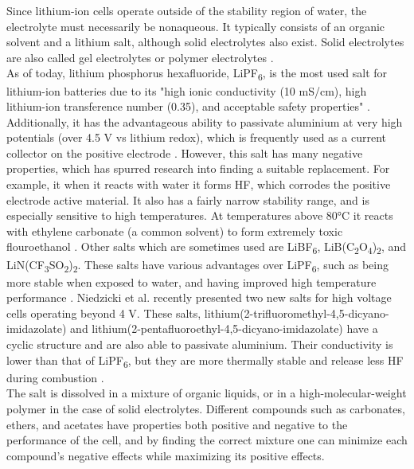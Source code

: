 \documentclass[12pt]{article} %
\begin{document}
Since lithium-ion cells operate outside of the stability region of water, the electrolyte must necessarily be nonaqueous.
It typically consists of an organic solvent and a lithium salt, although solid electrolytes also exist.
Solid electrolytes are also called gel electrolytes or polymer electrolytes \cite{reddy_thomas_section_2011-3}.
\\
As of today, lithium phosphorus hexafluoride, LiPF\textsubscript{6}, is the most used salt for lithium-ion batteries due to its "high ionic conductivity (10 mS/cm), high lithium-ion transference number (\mytilde{}0.35), and acceptable safety properties" \cite{reddy_thomas_section_2011-3}.
Additionally, it has the advantageous ability to passivate aluminium at very high potentials (over 4.5 V vs lithium redox), which is frequently used as a current collector on the positive electrode \cite{niedzicki_new_2011}.
However, this salt has many negative properties, which has spurred research into finding a suitable replacement.
For example, it when it reacts with water it forms HF, which corrodes the positive electrode active material.
It also has a fairly narrow stability range, and is especially sensitive to high temperatures.
At temperatures above 80°C it reacts with ethylene carbonate (a common solvent) to form extremely toxic flouroethanol \cite{hammami_lithium-ion_2003}.
Other salts which are sometimes used are LiBF\textsubscript{6}, LiB(C\textsubscript{2}O\textsubscript{4})\textsubscript{2}, and LiN(CF\textsubscript{3}SO\textsubscript{2})\textsubscript{2}.
These salts have various advantages over LiPF\textsubscript{6}, such as being more stable when exposed to water, and having improved high temperature performance \cite{reddy_thomas_section_2011-3}.
Niedzicki et al. recently presented two new salts for high voltage cells operating beyond 4 V.
These salts, lithium(2-trifluoromethyl-4,5-dicyano-imidazolate) and lithium(2-pentafluoroethyl-4,5-dicyano-imidazolate) have a cyclic structure and are also able to passivate aluminium.
Their conductivity is lower than that of LiPF\textsubscript{6}, but they are more thermally stable and release less HF during combustion \cite{niedzicki_new_2011}.
\\
The salt is dissolved in a mixture of organic liquids, or in a high-molecular-weight polymer in the case of solid electrolytes.
Different compounds such as carbonates, ethers, and acetates have properties both positive and negative to the performance of the cell, and by finding the correct mixture one can minimize each compound's negative effects while maximizing its positive effects.
\end{document}
